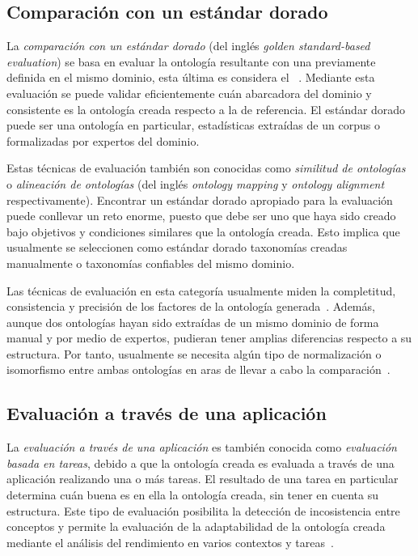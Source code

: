 \subsection{Comparación con un estándar dorado}
La \textit{comparación con un estándar dorado} (del inglés \textit{golden standard-based evaluation}) se basa en evaluar la ontología resultante con una previamente definida en el mismo dominio, esta última es considera el ~\cite{ref:93}. Mediante esta evaluación se puede validar eficientemente cuán abarcadora del dominio y consistente es la ontología creada respecto a la de referencia. El estándar dorado puede ser una ontología en particular, estadísticas extraídas de un corpus o formalizadas por expertos del dominio.

Estas técnicas de evaluación también son conocidas como \textit{similitud de ontologías} o \textit{alineación de ontologías} (del inglés \textit{ontology mapping} y \textit{ontology alignment} respectivamente). Encontrar un estándar dorado apropiado para la evaluación puede conllevar un reto enorme, puesto que debe ser uno que haya sido creado bajo objetivos y condiciones similares que la ontología creada. Esto implica que usualmente se seleccionen como estándar dorado taxonomías creadas manualmente o taxonomías confiables del mismo dominio.

Las técnicas de evaluación en esta categoría usualmente miden la completitud, consistencia y precisión de los factores de la ontología generada~\cite{ref:92}. Además, aunque dos ontologías hayan sido extraídas de un mismo dominio de forma manual y por medio de expertos, pudieran tener amplias diferencias respecto a su estructura. Por tanto, usualmente se necesita algún tipo de normalización o isomorfismo entre ambas ontologías en aras de llevar a cabo la comparación~\cite{ref:34}.

\subsection{Evaluación a través de una aplicación}
La \textit{evaluación a través de una aplicación} es también conocida como \textit{evaluación basada en tareas}, debido a que la ontología creada es evaluada a través de una aplicación realizando una o más tareas. El resultado de una tarea en particular determina cuán buena es en ella la ontología creada, sin tener en cuenta su estructura. Este tipo de evaluación posibilita la detección de incosistencia entre conceptos y permite la evaluación de la adaptabilidad de la ontología creada mediante el análisis del rendimiento en varios contextos y tareas~\cite{ref:94}.

